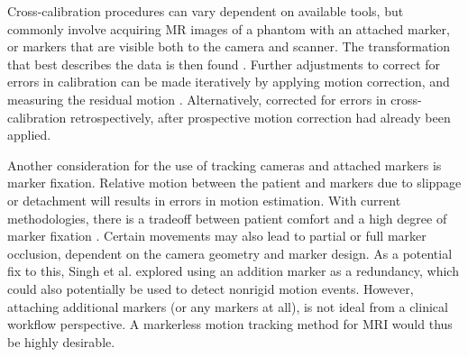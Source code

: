 \documentclass[class=article, crop=false]{standalone}
\begin{document}
\par 
Cross-calibration procedures can vary dependent on available tools, but commonly involve acquiring MR images of a phantom with an attached marker, or markers that are visible both to the camera and scanner. The transformation that best describes the data is then found \parencite{Zahneisen2014,Aksoy2011,Zaitsev2006a}. Further adjustments to correct for errors in calibration can be made iteratively by applying motion correction, and measuring the residual motion \parencite{Zaitsev2006a,Zahneisen2014}. Alternatively, \cite{Aksoy2012} corrected for errors in cross-calibration retrospectively, after prospective motion correction had already been applied.
\par
Another consideration for the use of tracking cameras and attached markers is marker fixation. Relative motion between the patient and markers due to slippage or detachment will results in errors in motion estimation. With current methodologies, there is a tradeoff between patient comfort and a high degree of marker fixation \parencite{Maclaren2013}. Certain movements may also lead to partial or full marker occlusion, dependent on the camera geometry and marker design. As a potential fix to this, Singh et al. \parencite*{Singh2015} explored using an addition marker as a redundancy, which could also potentially be used to detect nonrigid motion events. However, attaching additional markers (or any markers at all), is not ideal from a clinical workflow perspective. A markerless motion tracking method for MRI would thus be highly desirable.
\end{document}
